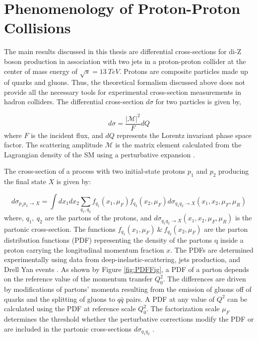 \section{Phenomenology of Proton-Proton Collisions }    
\label{sec:Pheno}

The main results discussed in this thesis are differential cross-sections for di-Z boson production in association with two jets in a proton-proton collider at the center of mass energy of $\sqrt{s}=13~TeV$. Protons are composite particles made up of quarks and gluons. Thus, the theoretical formalism discussed above does not provide all the necessary tools for experimental cross-section measurements in hadron colliders. The differential cross-section $d\sigma$ for two particles is given by, 

\begin{equation}
d\sigma  = \frac{{|\mathcal{M}|}^2}{F} dQ
\label{eqn:DiffxS}
\end{equation}
where $F$ is the incident flux, and $dQ$ represents the Lorentz invariant phase space factor. The scattering amplitude $\mathcal{M}$ is the matrix element calculated from the Lagrangian density of the SM using a perturbative expansion \cite{QCDForCollider}.

The cross-section of a process with two initial-state protons $p_{1}$ and $p_{2}$ producing the final state $X$ is given by:

\begin{equation}
d\sigma_{p_{1}p_{2} \rightarrow X } = \int dx_{1} dx_{2} \sum_{q_{1},q_{2}} f_{q_{1}}(x_{1},\mu_{F})f_{q_{2}}(x_{2},\mu_{F}) d\sigma_{q_{1}q_{2}\rightarrow X } (x_{1},x_{2},\mu_{F},\mu_{R})
\label{eqn:DifferentialPartonicXS}
\end{equation}
where, $q_{1},~ q_{2}$ are the partons of the protons, and $d\sigma_{q_{1}q_{2}\rightarrow X } (x_{1},x_{2},\mu_{F},\mu_{R})$ is the partonic cross-section. The functions $f_{q_{1}}(x_{1},\mu_{F}) ~\&~ f_{q_{2}}(x_{2},\mu_{F})$ are the parton distribution functions (PDF) representing the density of the partons q inside a proton carrying the longitudinal momentum fraction $x$. The PDFs are determined experimentally using data from deep-inelastic-scattering, jets production, and Drell Yan events \cite{FixedTargetDrellYan} \cite{PDF4LHC}. As shown by Figure \ref{fig:PDFFig}, a PDF of a parton depends on the reference value of the momentum transfer $Q_{0}^2$. The differences are driven by modifications of partons' momenta resulting from the emission of gluons off of quarks and the splitting of gluons to $q\bar{q}$ pairs. A PDF at any value of $Q^2$ can be calculated using the PDF at reference scale $Q_{0}^2$. The factorization scale $\mu_{F}$ determines the threshold whether the perturbative corrections modify the PDF or are included in the partonic cross-sections $d\sigma_{q_{1}q_{2}}$ \cite{QCDForCollider}.

